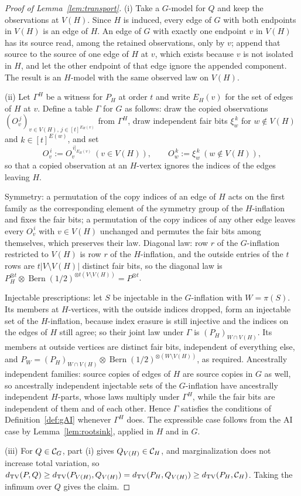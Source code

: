\documentclass[11pt]{article}
\theoremstyle{plain}
\theoremstyle{definition}
\DeclareMathOperator{\Bern}{Bern}
\DeclareMathOperator{\TV}{TV}
\begin{document}
\begin{proof}[Proof of Lemma~\ref{lem:transport}]
(i) Take a $G$-model for $Q$ and keep the observations at $V(H)$. Since $H$ is induced, every edge of $G$ with both endpoints in $V(H)$ is an edge of $H$. An edge of $G$ with exactly one endpoint $v$ in $V(H)$ has its source read, among the retained observations, only by $v$; append that source to the source of one edge of $H$ at $v$, which exists because $v$ is not isolated in $H$, and let the other endpoint of that edge ignore the appended component. The result is an $H$-model with the same observed law on $V(H)$.

(ii) Let $\Gamma^H$ be a witness for $P_H$ at order $t$ and write $E_H(v)$ for the set of edges of $H$ at $v$. Define a table $\Gamma$ for $G$ as follows: draw the copied observations $(O_v^{\,j})_{v\in V(H),\,j\in[t]^{E_H(v)}}$ from $\Gamma^H$, draw independent fair bits $\xi_w^{\,k}$ for $w\notin V(H)$ and $k\in[t]^{E(w)}$, and set
\[
O_v^{\,i}:=O_v^{\,i|_{E_H(v)}}\ (v\in V(H)),\qquad O_w^{\,k}:=\xi_w^{\,k}\ (w\notin V(H)),
\]
so that a copied observation at an $H$-vertex ignores the indices of the edges leaving $H$.

Symmetry: a permutation of the copy indices of an edge of $H$ acts on the first family as the corresponding element of the symmetry group of the $H$-inflation and fixes the fair bits; a permutation of the copy indices of any other edge leaves every $O_v^{\,i}$ with $v\in V(H)$ unchanged and permutes the fair bits among themselves, which preserves their law. Diagonal law: row $r$ of the $G$-inflation restricted to $V(H)$ is row $r$ of the $H$-inflation, and the outside entries of the $t$ rows are $t|V\setminus V(H)|$ distinct fair bits, so the diagonal law is $P_H^{\otimes t}\otimes\Bern(1/2)^{\otimes t(V\setminus V(H))}=P^{\otimes t}$.

Injectable prescriptions: let $S$ be injectable in the $G$-inflation with $W=\pi(S)$. Its members at $H$-vertices, with the outside indices dropped, form an injectable set of the $H$-inflation, because index erasure is still injective and the indices on the edges of $H$ still agree; so their joint law under $\Gamma$ is $(P_H)_{W\cap V(H)}$. Its members at outside vertices are distinct fair bits, independent of everything else, and $P_{W}=(P_H)_{W\cap V(H)}\otimes\Bern(1/2)^{\otimes(W\setminus V(H))}$, as required. Ancestrally independent families: source copies of edges of $H$ are source copies in $G$ as well, so ancestrally independent injectable sets of the $G$-inflation have ancestrally independent $H$-parts, whose laws multiply under $\Gamma^H$, while the fair bits are independent of them and of each other. Hence $\Gamma$ satisfies the conditions of Definition~\ref{def:gAI} whenever $\Gamma^H$ does. The expressible case follows from the AI case by Lemma~\ref{lem:rootsink}, applied in $H$ and in $G$.

(iii) For $Q\in\mathcal C_{G}$, part (i) gives $Q_{V(H)}\in\mathcal C_{H}$, and marginalization does not increase total variation, so $d_{\TV}(P,Q)\ge d_{\TV}(P_{V(H)},Q_{V(H)})=d_{\TV}(P_H,Q_{V(H)})\ge d_{\TV}(P_H,\Cscen{H})$. Taking the infimum over $Q$ gives the claim.
\end{proof}
\end{document}
